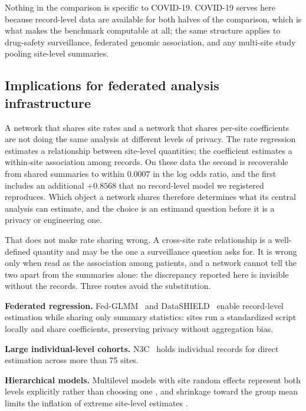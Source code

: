 \documentclass[11pt]{article}
\begin{document}
Nothing in the comparison is specific to COVID-19.  COVID-19 serves here because record-level data are
available for both halves of the comparison, which is what makes the
benchmark computable at all; the same structure applies to drug-safety
surveillance, federated genomic association, and any multi-site study
pooling site-level summaries.

\subsection{Implications for federated analysis infrastructure}

A network that shares site rates and a network that shares per-site
coefficients are not doing the same analysis at different levels of
privacy.  The rate regression estimates a relationship between
site-level quantities; the coefficient estimates a within-site
association among records.  On these data the second is recoverable from
shared summaries to within $0.0007$ in the log odds ratio, and the
first includes an additional $+0.8568$ that no record-level model we
registered reproduces.  Which object a network shares therefore
determines what its central analysis can estimate, and the choice is an
estimand question before it is a privacy or engineering one.

That does not make rate sharing wrong.  A cross-site rate relationship
is a well-defined quantity and may be the one a surveillance question
asks for.  It is wrong only when read as the association among patients,
and a network cannot tell the two apart from the summaries alone: the
discrepancy reported here is invisible without the records.  Three
routes avoid the substitution.

\textbf{Federated regression.}
Fed-GLMM~\cite{yan2023fedglmm} and
DataSHIELD~\cite{banerjee2022dssurvival} enable record-level estimation
while sharing only summary statistics: sites run a standardized script
locally and share coefficients, preserving privacy without aggregation
bias.

\textbf{Large individual-level cohorts.}  N3C~\cite{haendel2021n3c} holds individual
records for direct estimation across more than 75 sites.

\textbf{Hierarchical models.}  Multilevel models with site random
effects represent both levels explicitly rather than choosing one
\cite{diezroux2000multilevel}, and shrinkage toward the group mean
limits the inflation of extreme site-level estimates
\cite{gelman2012multilevel}.
\end{document}
